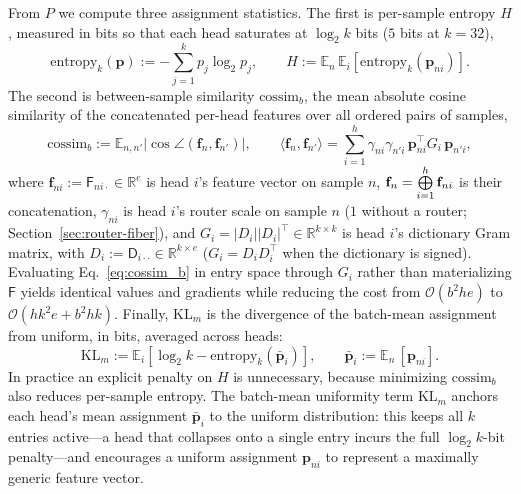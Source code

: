 From $P$ we compute three assignment statistics. The first is per-sample
entropy $H$, measured in bits so that each head saturates at $\log_2 k$
bits ($5$ bits at $k{=}32$),
\begin{equation}
	\mathrm{entropy}_k(\mathbf{p}) :=
	-\sum^{k}_{j=1}p_{j}\log_2 p_{j},
	\qquad
	H := \mathbb{E}_{n}\,\mathbb{E}_{i}\!\left[
	\mathrm{entropy}_k(\mathbf{p}_{ni})\right].
	\label{eq:entropy}
\end{equation}
The second is between-sample similarity $\mathrm{cossim}_b$, the mean
absolute cosine similarity of the concatenated per-head features over all
ordered pairs of samples,
\begin{equation}
	\mathrm{cossim}_b :=
	\mathbb{E}_{n,n'}\big\lvert
	\cos\angle(\mathbf{f}_{n}, \mathbf{f}_{n'})
	\big\rvert,
	\qquad
	\langle \mathbf{f}_{n}, \mathbf{f}_{n'}\rangle
	= \sum^{h}_{i=1}\gamma_{ni}\gamma_{n'i}\,
	\mathbf{p}_{ni}^{\top}G_{i}\,\mathbf{p}_{n'i},
	\label{eq:cossim_b}
\end{equation}
where $\mathbf{f}_{ni} := \mathsf{F}_{ni\cdot} \in \mathbb{R}^{e}$ is
head $i$'s feature vector on sample $n$,
$\mathbf{f}_n = \mathop{\bigoplus}\limits_{i=1}^{h}\mathbf{f}_{ni}$ is their concatenation,
$\gamma_{ni}$ is head $i$'s router scale on sample $n$ ($1$ without a
router; Section~\ref{sec:router-fiber}), and
$G_i = \lvert D_{i}\rvert \lvert D_{i}\rvert^{\top} \in \mathbb{R}^{k \times k}$
is head $i$'s dictionary Gram matrix, with
$D_i := \mathsf{D}_{i\cdot\cdot} \in \mathbb{R}^{k \times e}$ ($G_i =
D_i D_i^\top$ when the dictionary is signed). Evaluating
Eq.~\eqref{eq:cossim_b} in entry space through $G_i$ rather than
materializing $\mathsf{F}$ yields identical values and gradients while
reducing the cost from $\mathcal{O}(b^2he)$ to
$\mathcal{O}(hk^2e + b^2hk)$. Finally, $\mathrm{KL}_m$ is the divergence
of the batch-mean assignment from uniform, in bits, averaged across
heads:
\begin{equation}
	\mathrm{KL}_m := \mathbb{E}_{i}\!\left[\log_2 k -
	\mathrm{entropy}_k\!\left(\bar{\mathbf{p}}_i\right)\right],
	\qquad
	\bar{\mathbf{p}}_i := \mathbb{E}_{n}\,[\mathbf{p}_{ni}].
	\label{eq:KL}
\end{equation}
In practice an explicit penalty on $H$ is unnecessary, because minimizing
$\mathrm{cossim}_b$ also reduces per-sample entropy. The batch-mean
uniformity term $\mathrm{KL}_m$ anchors each head's mean assignment
$\bar{\mathbf{p}}_i$ to the uniform distribution: this keeps all $k$
entries active---a head that collapses onto a single entry incurs the
full $\log_2 k$-bit penalty---and encourages a uniform assignment
$\mathbf{p}_{ni}$ to represent a maximally generic feature vector.

